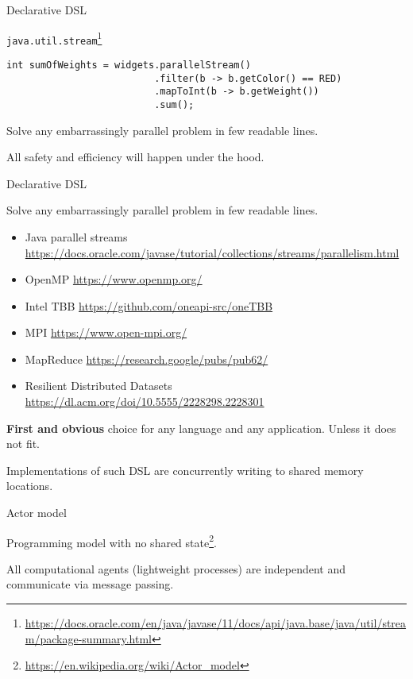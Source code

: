 \begin{frame}[fragile, t]{Declarative DSL}

\texttt{java.util.stream}\footnote{\tiny\url{https://docs.oracle.com/en/java/javase/11/docs/api/java.base/java/util/stream/package-summary.html}}

\begin{verbatim}
int sumOfWeights = widgets.parallelStream()
                          .filter(b -> b.getColor() == RED)
                          .mapToInt(b -> b.getWeight())
                          .sum();
\end{verbatim}

\pause

Solve any embarrassingly parallel problem in few readable lines.

\pause

All safety and efficiency will happen under the hood.

\end{frame}

\begin{frame}{Declarative DSL}


Solve any embarrassingly parallel problem in few readable lines.

\pause
\begin{itemize}
  \item Java parallel streams {\tiny\url{https://docs.oracle.com/javase/tutorial/collections/streams/parallelism.html}}
  \item OpenMP {\tiny\url{https://www.openmp.org/}}
  \item Intel TBB {\tiny\url{https://github.com/oneapi-src/oneTBB}}
  \item MPI {\tiny\url{https://www.open-mpi.org/}}
  \item MapReduce {\tiny\url{https://research.google/pubs/pub62/}}
  \item Resilient Distributed Datasets {\tiny\url{https://dl.acm.org/doi/10.5555/2228298.2228301}}
\end{itemize}

\pause
\textbf{First and obvious} choice for any language and any application. \pause Unless it does not fit.

\pause
Implementations of such DSL are concurrently writing to shared memory locations.
\end{frame}

\begin{frame}[t]{Actor model}

Programming model with no shared state\footnote{\tiny\url{https://en.wikipedia.org/wiki/Actor_model}}.

\pause

All computational agents (lightweight processes) are independent and communicate via message passing.

\end{frame}

